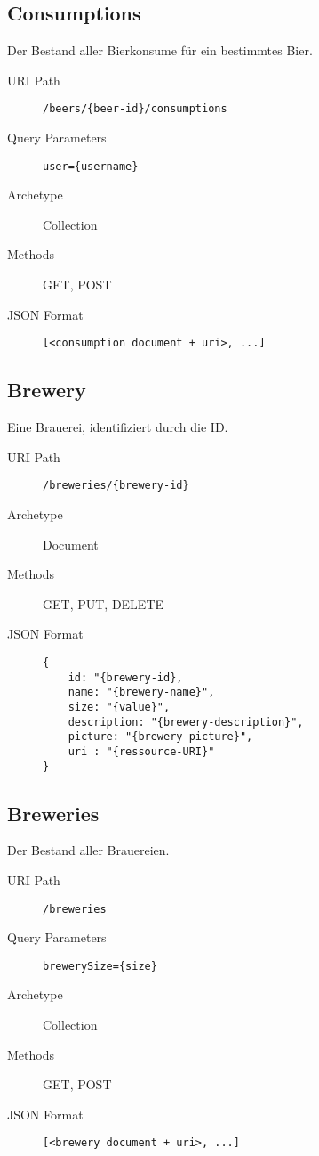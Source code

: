 \documentclass[10pt,a4paper]{scrartcl}
\begin{document}
\subsection{Consumptions}

Der Bestand aller Bierkonsume für ein bestimmtes Bier.

\begin{description}
	\item[URI Path] \texttt{/beers/\{beer-id\}/consumptions}
 	\item[Query Parameters] \texttt{user=\{username\}}
	\item[Archetype] Collection
	\item[Methods] GET, POST
	\item[JSON Format] \hfill
\begin{lstlisting}
[<consumption document + uri>, ...]
\end{lstlisting}
\end{description}


\subsection{Brewery}

Eine Brauerei, identifiziert durch die ID.

\begin{description}
	\item[URI Path] \texttt{/breweries/\{brewery-id\}}
	\item[Archetype] Document
	\item[Methods] GET, PUT, DELETE
	\item[JSON Format] \hfill
\begin{lstlisting}
{	
	id: "{brewery-id},
	name: "{brewery-name}",
	size: "{value}",
	description: "{brewery-description}",
	picture: "{brewery-picture}",
	uri : "{ressource-URI}"
}
\end{lstlisting}
\end{description}


\subsection{Breweries}

Der Bestand aller Brauereien.

\begin{description}
	\item[URI Path] \texttt{/breweries}
	\item[Query Parameters] \texttt{brewerySize=\{size\}}
	\item[Archetype] Collection
	\item[Methods] GET, POST
	\item[JSON Format] \hfill
\begin{lstlisting}
[<brewery document + uri>, ...]
\end{lstlisting}
\end{description}
\end{document}
